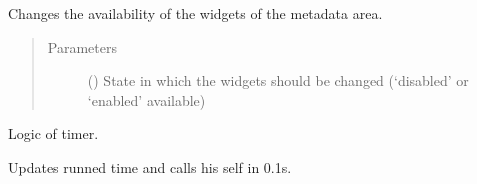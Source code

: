 \documentclass[letterpaper,10pt,english]{sphinxmanual}
\begin{document}
\begin{fulllineitems}
\begin{fulllineitems}
\end{fulllineitems}


\begin{fulllineitems}
\label{\detokenize{anoog.automation:anoog.automation.graphical_user_interface.Train_Window.change_init_state}}
\sphinxAtStartPar
Changes the availability of the widgets of the meta\sphinxhyphen{}data area.
\begin{quote}\begin{description}
\item[{Parameters}] \leavevmode
\sphinxAtStartPar
{} () \textendash{} State in which the widgets should be changed (‘disabled’ or ‘enabled’ available)

\end{description}\end{quote}

\end{fulllineitems}


\begin{fulllineitems}
\label{\detokenize{anoog.automation:anoog.automation.graphical_user_interface.Train_Window.change_run_time}}
\sphinxAtStartPar
Logic of timer.

\sphinxAtStartPar
Updates runned time and calls his self in 0.1s.

\end{fulllineitems}



\end{fulllineitems}
\end{document}
